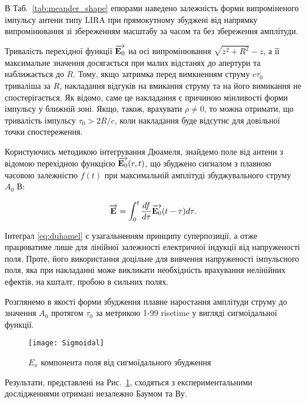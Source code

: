 В Таб.~\ref{tab:meander_shape} епюрами наведено залежність 
форми випроміненого імпульсу антени типу LIRA при прямокутному 
збуджені від напрямку випромінювання зі збереженням масштабу за 
часом та без збереження амплітуди.

Тривалість перехідної функції $ \overrightarrow{\mathbf E_0} $ на осі випромінювання 
$ \sqrt{z^2+R^2} - z $, а її максимальне значення досягається при малих 
відстанях до апертури та наближається до $ R $. Тому, якщо затримка перед 
вимкненням струму $ c \tau_0 $ триваліша за $ R $, накладання відгуків 
на вмикання струму та на його вимикання не спостерігається. Як відомо, саме 
це накладання є причиною мінливості форми імпульсу у ближній зоні. Якщо, 
також, врахувати $ \rho \neq 0 $, то можна отримати, що тривалість імпульсу 
$ \tau_0 > 2R/c $, коли накладання буде відсутнє для довільної 
точки спостереження.

Користуючись методикою інтегрування Дюамеля, \cite[ст. 40]{imp:Kharkevich1950} 
знайдемо поле від антени з відомою перехідною функцією $ \overrightarrow{\mathbf E_0} (r,t) $, 
що збуджено сигналом з плавною часовою залежністю $ f(t) $ при 
максимальній амплітуді збуджувального струму $ A_0 $ В:

\begin{equation} \label{eq:duhamel}
\overrightarrow{\mathbf E} = \int_0^t \frac{d f}{d \tau} \overrightarrow{\mathbf E_0} (t - \tau) d \tau.
\end{equation}

Інтеграл \eqref{eq:duhamel} є узагальненням принципу суперпозиції, а отже
працюватиме лише для лінійної залежності електричної індукції від 
напруженості поля. Проте, його використання доцільне для вивчення 
напруженості імпульсного поля, яка при накладанні може викликати 
необхідність врахування нелінійних ефектів, на кшталт, пробою в сильних полях.

Розглянемо в якості форми збудження плавне наростання амплітуди струму до 
значення $ A_0 $ протягом $ \tau_0 $ за метрикою 1-99 risetime у вигляді 
сигмоїдальної функції.

\begin{figure}[h] \begin{center}
\texttt{[image: Sigmoidal]}
\caption{$ E_x $ компонента поля від сигмоїдального збудження}
\label{fig:ex_sigmoidal}
\end{center} \end{figure}

Результати, представлені на Рис.~\ref{fig:ex_sigmoidal}, сходяться з 
експериментальними дослідженнями отримані незалежно Баумом та Ву.

